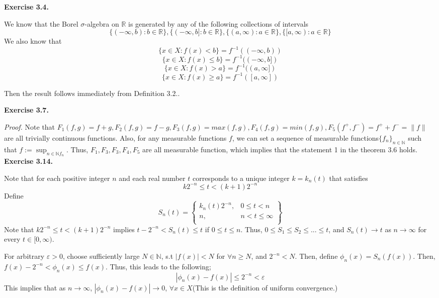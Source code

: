 \documentclass[letterpaper,12pt]{article}
\theoremstyle{definition}
\begin{document}
\begin{spacing}{1.3}{}
\textbf{Exercise 3.4.}

We know that the Borel $\sigma$-algebra on $\mathbb{R}$ is generated by any of the following collections of intervals
$$
\{(-\infty,b) : b \in \mathbb{R}\}, \{(-\infty,b] : b  \in \mathbb{R}\}, \{(a,\infty) :  a \in \mathbb{R}\}, \{[a, \infty) : a  \in \mathbb{R}\}
$$
We also know that 
$$ \{ x \in X : f(x) < b\} = f^{-1} ((-\infty,b))$$
$$ \{ x \in X : f(x) \leq b\} = f^{-1} ((-\infty,b]) $$
$$ \{ x \in X : f(x) > a\} = f^{-1} ((a,\infty]) $$
$$ \{ x \in X : f(x) \geq a\} = f^{-1} ([a,\infty])$$

 Then the result follows immediately from Definition 3.2..
 
 \textbf{Exercise 3.7.}
 
 \emph{Proof.} Note that $F_1(f,g) = f+g, F_2(f,g) = f-g, F_3(f,g) = max(f,g), F_4(f,g) = min(f,g), F_5(f^{+},f^{-}) = f^{+} + f^{-} = \|f\|$ are all trivially continuous functions. Also, for any measurable functions $f$, we can set a sequence of measurable functions$\{f_n\}_{n \in \mathbb{N}}$ such that $f:= \sup_{n \in \mathbb{N} f_n}$. Thus, $F_1, F_3, F_3, F_4, F_5$ are all measurable function, which implies that the statement 1 in the theorem 3.6 holds. \   \\
 
  \textbf{Exercise 3.14.}

 Note that for each positive integer $n$
 and each real number $t$ corresponds to a unique integer $k= k_n(t)$ that satisfies \\
 \[k 2^{-n} \leq t < (k+1) 2^{-n}\]
 Define
 \[
  S_n(t) = \left.
  \begin{cases}
    k_n(t) 2^{-n}, & 0 \leq t < n \\
    n, & n < t \leq \infty \\
  \end{cases}
  \right\}
\]
Note that $k 2^{-n} \leq t < (k+1) 2^{-n}$ implies $t - 2^{-n} < S_n(t) \leq t$ if $0 \leq t \leq n$. Thus, $0 \leq S_1 \leq S_2 \leq ... \leq t$, and $S_n(t) \rightarrow t$ as $n \rightarrow \infty$ for every $t \in [0,\infty)$.

For arbitrary $\varepsilon > 0$, choose sufficiently large $N \in \mathbb{N}$, s.t $|f(x)| < N$ for $\forall n \geq N$, and $2^{-n} < N$. Then, define $\phi_n(x) = S_n(f(x))$. Then, $f(x) - 2^{-n} < \phi_n(x) \leq f(x)$. Thus, this leads to the following;
\[|\phi_n(x) - f(x)| \leq 2^{-n} < \varepsilon\]
This implies that as $n \rightarrow \infty$, $|\phi_n(x) - f(x)| \rightarrow 0$, $\forall x \in X$(This is the definition of uniform convergence.) 


\end{spacing}
\end{document}
